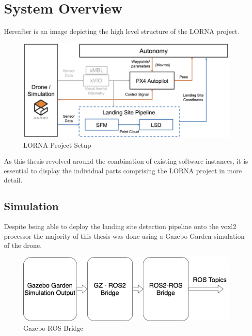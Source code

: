 \chapter{System Overview}

Hereafter is an image depicting the high level structure of the LORNA project.

\begin{figure}[ht]
    \centering
    \includegraphics[scale=0.18]{images/setup/setup_flowchart.png}
    \caption{LORNA Project Setup}
    \label{fig:lorna_setup}
\end{figure}

As this thesis revolved around the combination of existing software instances, it is essential to display the individual parts comprising the LORNA project in more detail.

\clearpage %
\section{Simulation}

Despite being able to deploy the landing site detection pipeline onto the voxl2 processor the majority of this thesis was done using a Gazebo Garden simulation of the drone. 

\begin{figure}[ht!]
    \centering
    \includegraphics[scale=0.45]{images/setup/GZ_flowchart.png}
    \caption{Gazebo ROS Bridge}
\end{figure}


